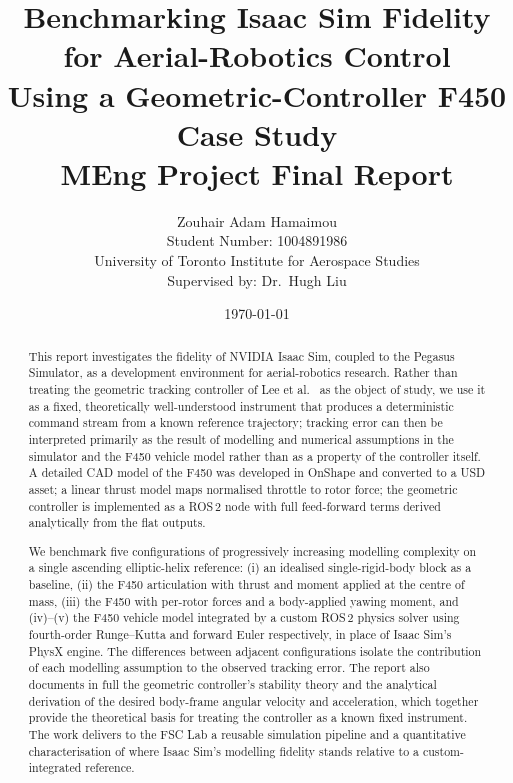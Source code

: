 \documentclass[11pt]{article}
\title{\textbf{Benchmarking Isaac Sim Fidelity for Aerial-Robotics Control\\
Using a Geometric-Controller F450 Case Study}\\[0.4em]
\large MEng Project Final Report}
\author{Zouhair Adam Hamaimou\\
Student Number: 1004891986\\[0.3em]
University of Toronto Institute for Aerospace Studies\\[0.3em]
Supervised by: Dr.~Hugh Liu}
\date{\today}
\theoremstyle{remark}
\begin{document}
\maketitle
\thispagestyle{empty}

\begin{abstract}
\noindent
This report investigates the fidelity of NVIDIA Isaac Sim, coupled to the Pegasus Simulator, as a development environment for aerial-robotics research. Rather than treating the geometric tracking controller of Lee et al.~\cite{Lee2010CDC} as the object of study, we use it as a fixed, theoretically well-understood instrument that produces a deterministic command stream from a known reference trajectory; tracking error can then be interpreted primarily as the result of modelling and numerical assumptions in the simulator and the F450 vehicle model rather than as a property of the controller itself. A detailed CAD model of the F450 was developed in OnShape and converted to a USD asset; a linear thrust model maps normalised throttle to rotor force; the geometric controller is implemented as a ROS\,2 node with full feed-forward terms derived analytically from the flat outputs.

We benchmark five configurations of progressively increasing modelling complexity on a single ascending elliptic-helix reference: (i) an idealised single-rigid-body block as a baseline, (ii) the F450 articulation with thrust and moment applied at the centre of mass, (iii) the F450 with per-rotor forces and a body-applied yawing moment, and (iv)--(v) the F450 vehicle model integrated by a custom ROS\,2 physics solver using fourth-order Runge--Kutta and forward Euler respectively, in place of Isaac Sim's PhysX engine. The differences between adjacent configurations isolate the contribution of each modelling assumption to the observed tracking error. The report also documents in full the geometric controller's stability theory and the analytical derivation of the desired body-frame angular velocity and acceleration, which together provide the theoretical basis for treating the controller as a known fixed instrument. The work delivers to the FSC Lab a reusable simulation pipeline and a quantitative characterisation of where Isaac Sim's modelling fidelity stands relative to a custom-integrated reference.
\end{abstract}

\newpage

\tableofcontents
\thispagestyle{empty}
\newpage
\end{document}

